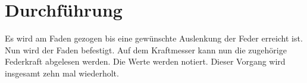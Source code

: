 \section{Durchführung}
\label{sec:Durchführung}

Es wird am Faden gezogen bis eine gewünschte Auslenkung der Feder erreicht ist. Nun wird der Faden befestigt. 
Auf dem Kraftmesser kann nun die zugehörige Federkraft abgelesen werden. 
Die Werte werden notiert. Dieser Vorgang wird insgesamt zehn mal wiederholt.
